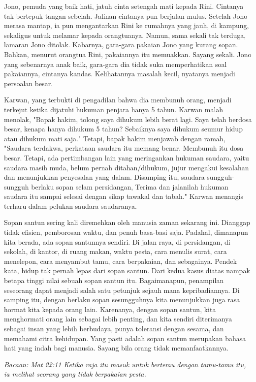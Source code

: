 
\small
	Jono, pemuda yang baik hati, jatuh cinta setengah mati kepada Rini. Cintanya tak bertepuk tangan sebelah. Jalinan cintanya pun berjalan mulus. Setelah Jono merasa mantap, ia pun mengantarkan Rini ke rumahnya yang jauh, di kampung, sekaligus untuk melamar kepada orangtuanya. Namun, sama sekali tak terduga, lamaran Jono ditolak. Kabarnya, gara-gara pakaian Jono yang kurang sopan. Bahkan, menurut orangtua Rini, pakaiannya itu memuakkan. Sayang sekali. Jono yang sebenarnya anak baik, gara-gara dia tidak suka memperhatikan soal pakaiannya, cintanya kandas. Kelihatannya masalah kecil, nyatanya menjadi persoalan besar.
	
	Karwan, yang terbukti di pengadilan bahwa dia membunuh orang, menjadi terkejut ketika dijatuhi hukuman penjara hanya 5 tahun. Karwan malah menolak, "Bapak hakim, tolong saya dihukum lebih berat lagi. Saya telah berdosa besar, kenapa hanya dihukum 5 tahun? Sebaiknya saya dihukum seumur hidup atau dihukum mati saja." Tetapi, bapak hakim menjawab dengan ramah, "Saudara terdakwa, perkataan saudara itu memang benar. Membunuh itu dosa besar. Tetapi, ada pertimbangan lain yang meringankan hukuman saudara, yaitu saudara masih muda, belum pernah ditahan/dihukum, jujur mengakui kesalahan dan menunjukkan penyesalan yang dalam. Disamping itu, saudara sungguh-sungguh berlaku sopan selam persidangan, Terima dan jalanilah hukuman saudara itu sampai selesai dengan sikap tawakal dan tabah." Karwan menangis terharu dalam pelukan saudara-saudaranya.

	Sopan santun sering kali diremehkan oleh manusia zaman sekarang ini. Dianggap tidak efisien, pemborosan waktu, dan penuh basa-basi saja. Padahal, dimanapun kita berada, ada sopan santunnya sendiri. Di jalan raya, di persidangan, di sekolah, di kantor, di ruang makan, waktu pesta, cara menulis surat, cara menelepon, cara menyambut tamu, cara berpakaian, dan sebagainya. Pendek kata, hidup tak pernah lepas dari sopan santun. Dari kedua kasus diatas nampak betapa tinggi nilai sebuah sopan santun itu.  Bagaimanapun, penampilan seseorang dapat menjadi salah satu petunjuk sejauh mana kepribadiannya. Di samping itu, dengan berlaku sopan sesungguhnya kita menunjukkan juga rasa hormat kita kepada orang lain. Karenanya, dengan sopan santun, kita menghormati orang lain sebagai lebih penting, dan kita sendiri diterimanya sebagai insan yang lebih berbudaya, punya toleransi dengan sesama, dan memahami citra kehidupan. Yang pasti adalah sopan santun merupakan bahasa hati yang indah bagi manusia. Sayang bila orang tidak memanfaatkannya.

\vspace{0.5cm}

{\noindent \emph{Bacaan: Mat 22:11	Ketika raja itu masuk untuk bertemu dengan tamu-tamu itu, ia melihat seorang yang tidak berpakaian pesta.}}
\normalsize